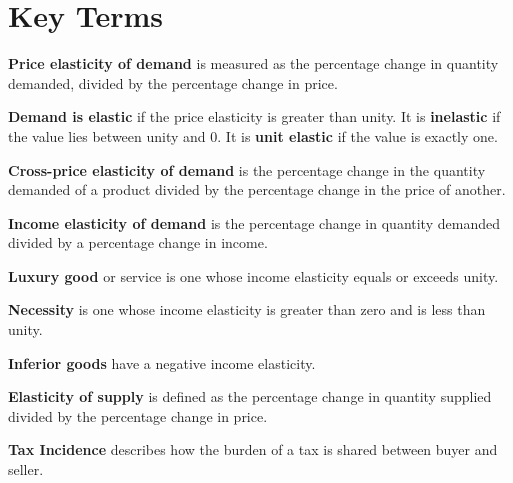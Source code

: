 \newpage
	\section*{Key Terms}
\begin{keyterms}
\textbf{Price elasticity of demand} is measured as the percentage change in quantity demanded, divided by the percentage change in price.

\textbf{Demand is elastic} if the price elasticity is greater than unity. It is \textbf{inelastic} if the value lies between unity and 0. It is \textbf{unit elastic} if the value is exactly one.

\textbf{Cross-price elasticity of demand} is the percentage change in the quantity demanded of a product divided by the percentage change in the price of another.

\textbf{Income elasticity of demand} is the percentage change in quantity demanded divided by a percentage change in income.

\textbf{Luxury good} or service is one whose income elasticity equals or exceeds unity.

\textbf{Necessity} is one whose income elasticity is greater than zero and is less than unity.

\textbf{Inferior goods} have a negative income elasticity.

\textbf{Elasticity of supply} is defined as the percentage change in quantity supplied divided by the percentage change in price.

\textbf{Tax Incidence} describes how the burden of a tax is shared between buyer and seller.
\end{keyterms}